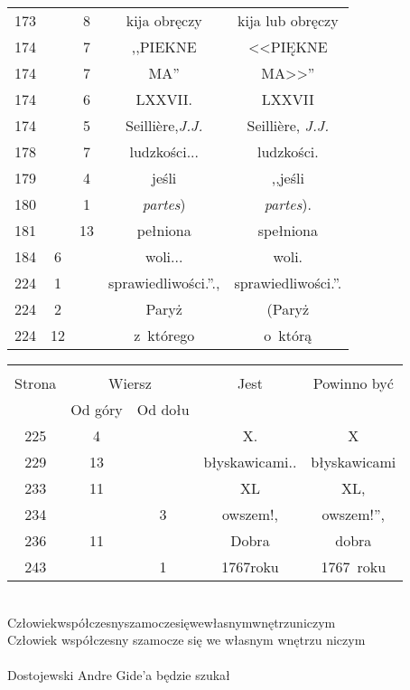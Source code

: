 \documentclass[a4paper,11pt]{article}
\begin{document}
\begin{center}
\begin{tabular}{|c|c|c|c|c|}
    173 & &  8 & kija obręczy & kija lub obręczy \\
    174 & &  7 & ,,PIEKNE  %
           & <<PIĘKNE  %
    \\
    174 & &  7 & {\footnotesize MA}'' & {\footnotesize MA}>>'' \\
    174 & &  6 & LXXVII. & LXXVII \\
    174 & &  5 & Seilli\`{e}re,\emph{J.J.} & Seilli\`{e}re, \emph{J.J.} \\
    178 & &  7 & ludzkości... & ludzkości. \\
    179 & &  4 & jeśli & ,,jeśli  %
    \\
    180 & &  1 & \emph{partes}) & \emph{partes}). \\
    181 & & 13 & pełniona & spełniona \\
    184 &  6 & & woli... & woli. \\
    224 &  1 & & sprawiedliwości.''., & sprawiedliwości.''. \\
    224 &  2 & & Paryż & (Paryż \\
    224 & 12 & & z~którego & o~którą \\
    \hline
  \end{tabular}

    \begin{tabular}{|c|c|c|c|c|}
    \hline
    & \multicolumn{2}{c|}{} & & \\
    Strona & \multicolumn{2}{c|}{Wiersz} & Jest
                              & Powinno być \\ \cline{2-3}
    & Od góry & Od dołu & & \\
    \hline
    225 &  4 & & X. & X \\
    229 & 13 & & błyskawicami.. & błyskawicami \\
    233 & 11 & & XL & XL, \\
    234 & &  3 & owszem!, & owszem!'', \\
    236 & 11 & & Dobra & dobra \\
    243 & &  1 & 1767roku & 1767~roku \\
    \hline
  \end{tabular}
\end{center}
\noi
{} \\
\Jest Człowiekwspółczesnyszamoczesięwewłasnymwnętrzuniczym \\
\Pow  Człowiek współczesny szamocze się we własnym wnętrzu niczym \\
 \\
\Jest Dostojewski Andre Gide'a będzie szukał \\
\end{document}
